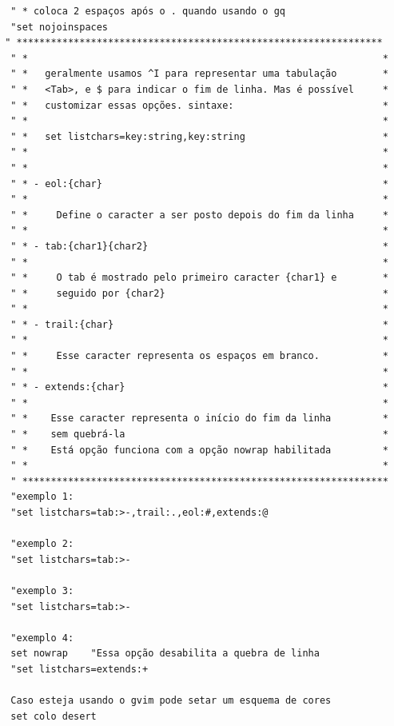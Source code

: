\documentclass[10pt,a4paper,openany]{book}
\begin{document}
\begin{verbatim}
  " * coloca 2 espaços após o . quando usando o gq
  "set nojoinspaces
 " ****************************************************************
  " *                                                              *
  " *   geralmente usamos ^I para representar uma tabulação        *
  " *   <Tab>, e $ para indicar o fim de linha. Mas é possível     *
  " *   customizar essas opções. sintaxe:                          *
  " *                                                              *
  " *   set listchars=key:string,key:string                        *
  " *                                                              *
  " *                                                              *
  " * - eol:{char}                                                 *
  " *                                                              *
  " *     Define o caracter a ser posto depois do fim da linha     *
  " *                                                              *
  " * - tab:{char1}{char2}                                         *
  " *                                                              *
  " *     O tab é mostrado pelo primeiro caracter {char1} e        *
  " *     seguido por {char2}                                      *
  " *                                                              *
  " * - trail:{char}                                               *
  " *                                                              *
  " *     Esse caracter representa os espaços em branco.           *
  " *                                                              *
  " * - extends:{char}                                             *
  " *                                                              *
  " *    Esse caracter representa o início do fim da linha         *
  " *    sem quebrá-la                                             *
  " *    Está opção funciona com a opção nowrap habilitada         * 
  " *                                                              *
  " ****************************************************************
  "exemplo 1:
  "set listchars=tab:>-,trail:.,eol:#,extends:@

  "exemplo 2:
  "set listchars=tab:>-

  "exemplo 3:
  "set listchars=tab:>-

  "exemplo 4:
  set nowrap    "Essa opção desabilita a quebra de linha
  "set listchars=extends:+

  Caso esteja usando o gvim pode setar um esquema de cores
  set colo desert
\end{verbatim}
\end{document}
